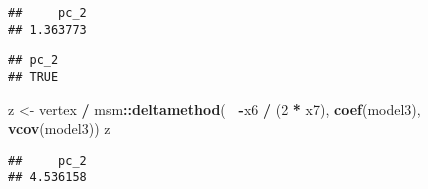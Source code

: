 \documentclass[
]{article}
\newenvironment{Shaded}{\begin{snugshade}}{\end{snugshade}}
\newcommand{\DecValTok}[1]{\textcolor[rgb]{0.00,0.00,0.81}{#1}}
\newcommand{\KeywordTok}[1]{\textcolor[rgb]{0.13,0.29,0.53}{\textbf{#1}}}
\newcommand{\NormalTok}[1]{#1}
\newcommand{\OperatorTok}[1]{\textcolor[rgb]{0.81,0.36,0.00}{\textbf{#1}}}
\newcommand{\StringTok}[1]{\textcolor[rgb]{0.31,0.60,0.02}{#1}}
\begin{document}
\begin{verbatim}
##     pc_2 
## 1.363773
\end{verbatim}

\begin{Shaded}
\end{Shaded}

\begin{verbatim}
## pc_2 
## TRUE
\end{verbatim}

\begin{Shaded}
\begin{Highlighting}[]
\NormalTok{z <-}\StringTok{ }\NormalTok{vertex }\OperatorTok{/}\StringTok{ }\NormalTok{msm}\OperatorTok{::}\KeywordTok{deltamethod}\NormalTok{(}\OperatorTok{~}\StringTok{ }\OperatorTok{-}\NormalTok{x6 }\OperatorTok{/}\StringTok{ }\NormalTok{(}\DecValTok{2} \OperatorTok{*}\StringTok{ }\NormalTok{x7), }\KeywordTok{coef}\NormalTok{(model3), }\KeywordTok{vcov}\NormalTok{(model3))}
\NormalTok{z}
\end{Highlighting}
\end{Shaded}

\begin{verbatim}
##     pc_2 
## 4.536158
\end{verbatim}
\end{document}
